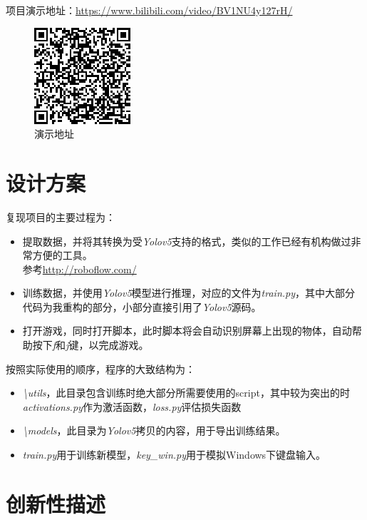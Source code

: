\documentclass[a4paper]{ltxdoc}
\begin{document}
项目演示地址：\url {https://www.bilibili.com/video/BV1NU4y127rH/}

\begin{figure}[h]
    \centering
    \includegraphics[scale = 1]{img/qrcode.png}
    \caption{演示地址}
\end{figure}

\section{设计方案}

复现项目的主要过程为：

\begin{itemize}
    \item 提取数据，并将其转换为受\textit{Yolov5}支持的格式，类似的工作已经有机构做过非常方便的工具。\\ 参考\url {http://roboflow.com/}
    \item 训练数据，并使用\textit{Yolov5}模型进行推理，对应的文件为\textit{train.py}，其中大部分代码为我重构的部分，小部分直接引用了\textit{Yolov5}源码。
    \item 打开游戏，同时打开脚本，此时脚本将会自动识别屏幕上出现的物体，自动帮助按下\textit{f}和\textit{j}键，以完成游戏。
\end{itemize}

按照实际使用的顺序，程序的大致结构为：

\begin{itemize}
    \item \textit{\backslash utils}，此目录包含训练时绝大部分所需要使用的script，其中较为突出的时\textit{activations.py}作为激活函数，\textit{loss.py}评估损失函数
    \item \textit{\backslash models}，此目录为\textit{Yolov5}拷贝的内容，用于导出训练结果。
    \item \textit{train.py}用于训练新模型，\textit{key\_win.py}用于模拟Windows下键盘输入。
\end{itemize}

\section{创新性描述}
\end{document}
